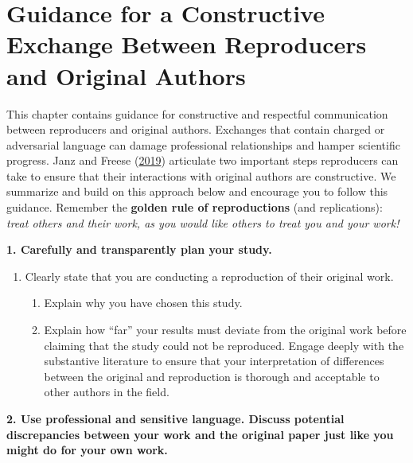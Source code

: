 \documentclass[]{book}
\providecommand{\tightlist}{%
  \setlength{\itemsep}{0pt}\setlength{\parskip}{0pt}}
\begin{document}
\hypertarget{guidance-for-a-constructive-exchange-between-reproducers-and-original-authors}{%
\chapter{Guidance for a Constructive Exchange Between Reproducers and Original Authors}\label{guidance-for-a-constructive-exchange-between-reproducers-and-original-authors}}

This chapter contains guidance for constructive and respectful communication between reproducers and original authors. Exchanges that contain charged or adversarial language can damage professional relationships and hamper scientific progress. Janz and Freese (\href{https://www.mzes.uni-mannheim.de/openscience/wp-content/uploads/2019/01/Janz-Freese_-Good-and-Bad-Replications-1.pdf}{2019}) articulate two important steps reproducers can take to ensure that their interactions with original authors are constructive. We summarize and build on this approach below and encourage you to follow this guidance. Remember the \textbf{golden rule of reproductions} (and replications): \emph{treat others and their work, as you would like others to treat you and your work!}

\textbf{1. Carefully and transparently plan your study.}

\begin{enumerate}
\def\labelenumi{\alph{enumi}.}
\tightlist
\item
  Clearly state that you are conducting a reproduction of their original work.

  \begin{enumerate}
  \def\labelenumii{\alph{enumii}.}
  \setcounter{enumii}{1}
  \tightlist
  \item
    Explain why you have chosen this study.
  \item
    Explain how ``far'' your results must deviate from the original work before claiming that the study could not be reproduced. Engage deeply with the substantive literature to ensure that your interpretation of differences between the original and reproduction is thorough and acceptable to other authors in the field.
  \end{enumerate}
\end{enumerate}

\textbf{2. Use professional and sensitive language. Discuss potential discrepancies between your work and the original paper just like you might do for your own work.}
\end{document}
